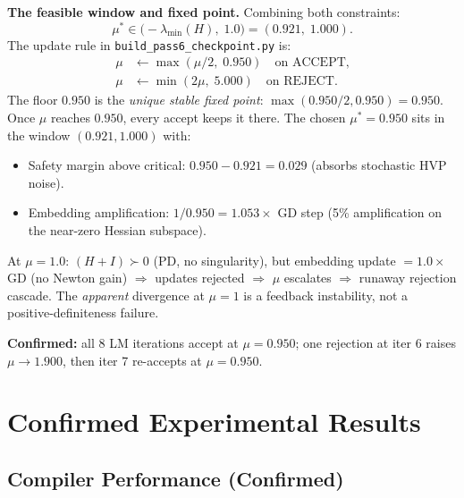 \documentclass[11pt]{amsart}
\begin{document}
\textbf{The feasible window and fixed point.}
Combining both constraints:
\[
  \mu^* \in \bigl(-\lambda_{\min}(H),\; 1.0\bigr) = (0.921,\; 1.000).
\]
The update rule in \texttt{build\_pass6\_checkpoint.py} is:
\begin{align*}
  \mu &\leftarrow \max(\mu/2,\; 0.950) \quad \text{on ACCEPT,} \\
  \mu &\leftarrow \min(2\mu,\; 5.000) \quad \text{on REJECT.}
\end{align*}
The floor $0.950$ is the \emph{unique stable fixed point}:
$\max(0.950/2, 0.950) = 0.950$.
Once $\mu$ reaches $0.950$, every accept keeps it there.
The chosen $\mu^* = 0.950$ sits in the window $(0.921, 1.000)$ with:
\begin{itemize}
  \item Safety margin above critical: $0.950 - 0.921 = 0.029$
        (absorbs stochastic HVP noise).
  \item Embedding amplification: $1/0.950 = 1.053\times$ GD step
        (5\% amplification on the near-zero Hessian subspace).
\end{itemize}
At $\mu=1.0$: $(H+I)\succ 0$ (PD, no singularity), but embedding update
$= 1.0\times$ GD (no Newton gain) $\Rightarrow$ updates rejected
$\Rightarrow$ $\mu$ escalates $\Rightarrow$ runaway rejection cascade.
The \emph{apparent} divergence at $\mu=1$ is a feedback instability,
not a positive-definiteness failure.

\textbf{Confirmed:} all 8 LM iterations accept at $\mu=0.950$;
one rejection at iter 6 raises $\mu\to 1.900$, then iter 7 re-accepts
at $\mu=0.950$.



\section{Confirmed Experimental Results}
\label{sec:results}

\subsection{Compiler Performance (Confirmed)}
\end{document}
